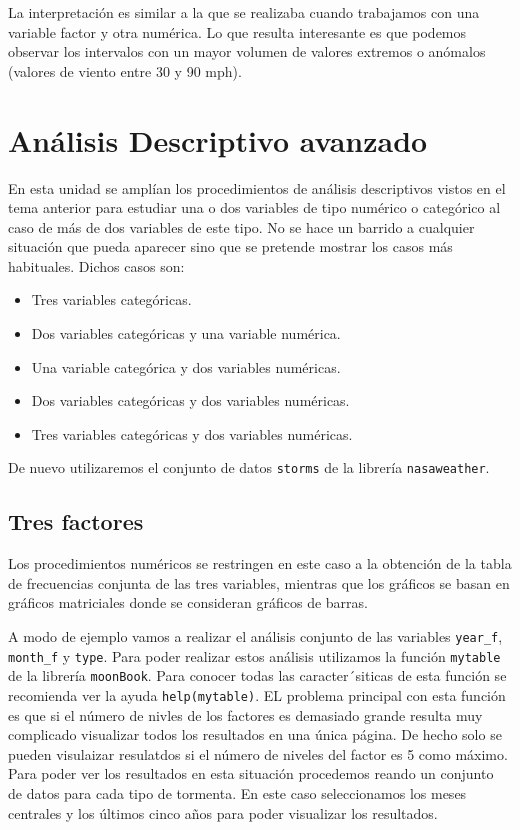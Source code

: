 \documentclass[
]{book}
\providecommand{\tightlist}{%
  \setlength{\itemsep}{0pt}\setlength{\parskip}{0pt}}
\begin{document}
La interpretación es similar a la que se realizaba cuando trabajamos con una variable factor y otra numérica. Lo que resulta interesante es que podemos observar los intervalos con un mayor volumen de valores extremos o anómalos (valores de viento entre 30 y 90 mph).

\hypertarget{anuxe1lisis-descriptivo-avanzado}{%
\section{Análisis Descriptivo avanzado}\label{anuxe1lisis-descriptivo-avanzado}}

En esta unidad se amplían los procedimientos de análisis descriptivos vistos en el tema anterior para estudiar una o dos variables de tipo numérico o categórico al caso de más de dos variables de este tipo. No se hace un barrido a cualquier situación que pueda aparecer sino que se pretende mostrar los casos más habituales. Dichos casos son:

\begin{itemize}
\tightlist
\item
  Tres variables categóricas.
\item
  Dos variables categóricas y una variable numérica.
\item
  Una variable categórica y dos variables numéricas.
\item
  Dos variables categóricas y dos variables numéricas.
\item
  Tres variables categóricas y dos variables numéricas.
\end{itemize}

De nuevo utilizaremos el conjunto de datos \texttt{storms} de la librería \texttt{nasaweather}.

\hypertarget{tres-factores}{%
\subsection{Tres factores}\label{tres-factores}}

Los procedimientos numéricos se restringen en este caso a la obtención de la tabla de frecuencias conjunta de las tres variables, mientras que los gráficos se basan en gráficos matriciales donde se consideran gráficos de barras.

A modo de ejemplo vamos a realizar el análisis conjunto de las variables \texttt{year\_f}, \texttt{month\_f} y \texttt{type}. Para poder realizar estos análisis utilizamos la función \texttt{mytable} de la librería \texttt{moonBook}. Para conocer todas las caracter´siticas de esta función se recomienda ver la ayuda \texttt{help(mytable)}. EL problema principal con esta función es que si el número de nivles de los factores es demasiado grande resulta muy complicado visualizar todos los resultados en una única página. De hecho solo se pueden visulaizar resulatdos si el número de niveles del factor es 5 como máximo. Para poder ver los resultados en esta situación procedemos reando un conjunto de datos para cada tipo de tormenta. En este caso seleccionamos los meses centrales y los últimos cinco años para poder visualizar los resultados.
\end{document}
